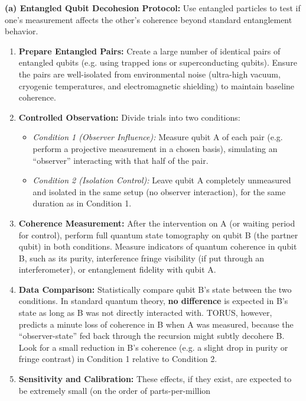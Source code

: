 \textbf{(a) Entangled Qubit Decohesion Protocol:} Use entangled
particles to test if one's measurement affects the other's coherence
beyond standard entanglement behavior.

\begin{enumerate}
\def\labelenumi{\arabic{enumi}.}
\item
  \textbf{Prepare Entangled Pairs:} Create a large number of identical
  pairs of entangled qubits (e.g. using trapped ions or superconducting
  qubits). Ensure the pairs are well-isolated from environmental noise
  (ultra-high vacuum, cryogenic temperatures, and electromagnetic
  shielding) to maintain baseline coherence.
\item
  \textbf{Controlled Observation:} Divide trials into two conditions:

  \begin{itemize}
  \item
    \emph{Condition 1 (Observer Influence):} Measure qubit A of each
    pair (e.g. perform a projective measurement in a chosen basis),
    simulating an ``observer'' interacting with that half of the pair.
  \item
    \emph{Condition 2 (Isolation Control):} Leave qubit A completely
    unmeasured and isolated in the same setup (no observer interaction),
    for the same duration as in Condition 1.
  \end{itemize}
\item
  \textbf{Coherence Measurement:} After the intervention on A (or
  waiting period for control), perform full quantum state tomography on
  qubit B (the partner qubit) in both conditions. Measure indicators of
  quantum coherence in qubit B, such as its purity, interference fringe
  visibility (if put through an interferometer), or entanglement
  fidelity with qubit A.
\item
  \textbf{Data Comparison:} Statistically compare qubit B's state
  between the two conditions. In standard quantum theory, \textbf{no
  difference} is expected in B's state as long as B was not directly
  interacted with. TORUS, however, predicts a minute loss of coherence
  in B when A was measured, because the ``observer-state'' fed back
  through the recursion might subtly decohere B​. Look for a small
  reduction in B's coherence (e.g. a slight drop in purity or fringe
  contrast) in Condition 1 relative to Condition 2.
\item
  \textbf{Sensitivity and Calibration:} These effects, if they exist,
  are expected to be extremely small (on the order of parts-per-million

\end{enumerate}
